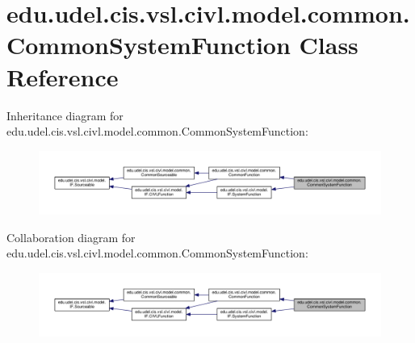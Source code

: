 \hypertarget{classedu_1_1udel_1_1cis_1_1vsl_1_1civl_1_1model_1_1common_1_1CommonSystemFunction}{}\section{edu.\+udel.\+cis.\+vsl.\+civl.\+model.\+common.\+Common\+System\+Function Class Reference}
\label{classedu_1_1udel_1_1cis_1_1vsl_1_1civl_1_1model_1_1common_1_1CommonSystemFunction}


Inheritance diagram for edu.\+udel.\+cis.\+vsl.\+civl.\+model.\+common.\+Common\+System\+Function\+:
\nopagebreak
\begin{figure}[H]
\begin{center}
\leavevmode
\includegraphics[width=350pt]{classedu_1_1udel_1_1cis_1_1vsl_1_1civl_1_1model_1_1common_1_1CommonSystemFunction__inherit__graph}
\end{center}
\end{figure}


Collaboration diagram for edu.\+udel.\+cis.\+vsl.\+civl.\+model.\+common.\+Common\+System\+Function\+:
\nopagebreak
\begin{figure}[H]
\begin{center}
\leavevmode
\includegraphics[width=350pt]{classedu_1_1udel_1_1cis_1_1vsl_1_1civl_1_1model_1_1common_1_1CommonSystemFunction__coll__graph}
\end{center}
\end{figure}
